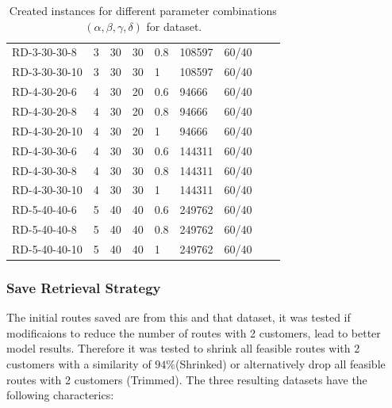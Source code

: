 \begin{table}[h!]
\begin{tabular}{@{}L{0.17\textwidth}P{0.04\textwidth}P{0.04\textwidth}P{0.04\textwidth}P{0.05\textwidth}P{0.09\textwidth}P{0.10\textwidth}P{0.12\textwidth}P{0.12\textwidth}@{}}
        RD-3-30-30-8  & 3        & 30      & 30       & 0.8      & 108597 & 60/40   &          &           \\
        RD-3-30-30-10 & 3        & 30      & 30       & 1        & 108597 & 60/40   &          &           \\
        RD-4-30-20-6  & 4        & 30      & 20       & 0.6      & 94666  & 60/40   &          &           \\
        RD-4-30-20-8  & 4        & 30      & 20       & 0.8      & 94666  & 60/40   &          &           \\
        RD-4-30-20-10 & 4        & 30      & 20       & 1        & 94666  & 60/40   &          &           \\
        RD-4-30-30-6  & 4        & 30      & 30       & 0.6      & 144311 & 60/40   &          &           \\
        RD-4-30-30-8  & 4        & 30      & 30       & 0.8      & 144311 & 60/40   &          &           \\
        RD-4-30-30-10 & 4        & 30      & 30       & 1        & 144311 & 60/40   &          &           \\
        RD-5-40-40-6  & 5        & 40      & 40       & 0.6      & 249762 & 60/40   &          &           \\
        RD-5-40-40-8  & 5        & 40      & 40       & 0.8      & 249762 & 60/40   &          &           \\
        RD-5-40-40-10 & 5        & 40      & 40       & 1        & 249762 & 60/40   &          &           \\
        \bottomrule
    \end{tabular}
    \caption{Created instances for different parameter combinations $(\alpha, \beta, \gamma, \delta)$ for \gendreauDataSetText dataset.}
    \label{tab:created_instances_xyz_gendreau}
\end{table}

\subsubsection{Save Retrieval Strategy}
The initial routes saved are from this and that dataset, it was tested if modificaions to reduce
the number of routes with 2 customers, lead to better model results. Therefore it was tested
to shrink all feasible routes with 2 customers with a similarity of $94\%$(Shrinked) or alternatively drop
all feasible routes with 2 customers (Trimmed). The three resulting datasets have the following characterics:

